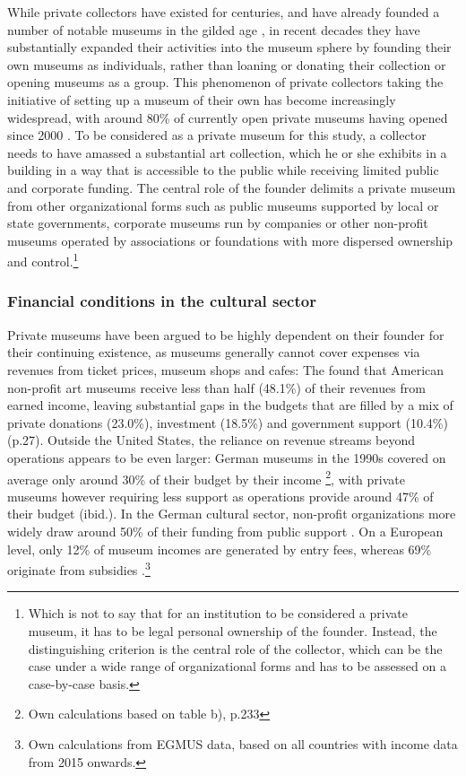 \documentclass[12pt]{article}
\begin{document}
While private collectors have existed for centuries, and have already founded a number of notable museums in the gilded age \parencite{Higonnet_2003_sight,Duncan_1995_civilizing}, in recent decades they have substantially expanded their activities into the museum sphere by founding their own museums as individuals, rather than loaning or donating their collection or opening museums as a group.
This phenomenon of private collectors taking the initiative of setting up a museum of their own has become increasingly widespread, with around 80\% of currently open private museums having opened since 2000 \parencite{Velthuis_etal_2023_boom}.
To be considered as a private museum for this study, a collector needs to have amassed a substantial art collection, which he or she exhibits in a building in a way that is accessible to the public while receiving limited public and corporate funding.
The central role of the founder delimits a private museum from other organizational forms such as public museums supported by local or state governments, corporate museums run by companies or other non-profit museums operated by associations or foundations with more dispersed ownership and control.\footnote{Which is not to say that for an institution to be considered a private museum, it has to be legal personal ownership of the founder. Instead, the distinguishing criterion is the central role of the collector, which can be the case under a wide range of organizational forms and has to be assessed on a case-by-case basis.}
\subsubsection*{Financial conditions in the cultural sector}


Private museums have been argued to be highly dependent on their founder for their continuing existence, as museums generally cannot cover expenses via revenues from ticket prices, museum shops and cafes:
The \textcite{IMLS_2008_funding} found that American non-profit art museums receive less than half (48.1\%) of their revenues from earned income, leaving substantial gaps in the budgets that are filled by a mix of private donations (23.0\%), investment (18.5\%) and government support (10.4\%) (p.27).
Outside the United States, the reliance on revenue streams beyond operations appears to be even larger:
German museums in the 1990s covered on average only around 30\% of their budget by their income \parencite{Martin_1993_museen}\footnote{Own calculations based on table b), p.233}, with private museums however requiring less support as operations provide around 47\% of their budget (ibid.).
In the German cultural sector, non-profit organizations more widely draw around 50\% of their funding from public support \parencite[p.82]{Zimmer_Priller_2007_gemeinnuetzig}.
On a European level, only 12\% of museum incomes are generated by entry fees, whereas 69\% originate from subsidies \parencite{EGMUS_2024_complete}.\footnote{Own calculations from EGMUS data, based on all countries with income data from 2015 onwards.}
\end{document}
